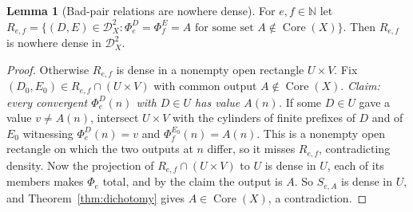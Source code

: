 \documentclass[11pt,letterpaper]{article}
\theoremstyle{definition}
\newtheorem{lemma}[definition]{Lemma}
\numberwithin{equation}{section}
\newcommand{\N}{\mathbb N}
\newcommand{\DX}[1]{\mathcal D_{#1}}
\newcommand{\Core}{\operatorname{Core}}
\newcommand{\src}[1]{\leavevmode{\sffamily\footnotesize\color{Steel}[#1]}}
\begin{document}
\begin{lemma}[Bad-pair relations are nowhere dense]\label{lem:badpairs}\src{R9}
For $e,f\in\N$ let $R_{e,f}=\{(D,E)\in\DX X^2:\Phi_e^D=\Phi_f^E=A\text{ for some set }A\notin\Core(X)\}$. Then $R_{e,f}$ is nowhere dense in $\DX X^2$.
\end{lemma}
\begin{proof}
Otherwise $R_{e,f}$ is dense in a nonempty open rectangle $U\times V$. Fix $(D_0,E_0)\in R_{e,f}\cap(U\times V)$ with common output $A\notin\Core(X)$. \emph{Claim: every convergent $\Phi_e^D(n)$ with $D\in U$ has value $A(n)$.} If some $D\in U$ gave a value $v\ne A(n)$, intersect $U\times V$ with the cylinders of finite prefixes of $D$ and of $E_0$ witnessing $\Phi_e^D(n)=v$ and $\Phi_f^{E_0}(n)=A(n)$. This is a nonempty open rectangle on which the two outputs at $n$ differ, so it misses $R_{e,f}$, contradicting density. Now the projection of $R_{e,f}\cap(U\times V)$ to $U$ is dense in $U$, each of its members makes $\Phi_e$ total, and by the claim the output is $A$. So $S_{e,A}$ is dense in $U$, and Theorem~\ref{thm:dichotomy} gives $A\in\Core(X)$, a contradiction.
\end{proof}
\end{document}
